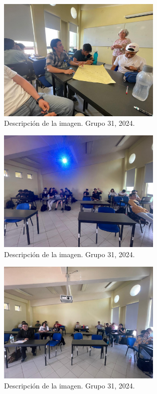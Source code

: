 \begin{figure}
    \caption{Descripción de la imagen. Grupo 31, 2024.\label{fig:No.1}}
    \includegraphics[width=0.7\textwidth]{./assets/img/imagen1DH.jpeg}
\end{figure}

\begin{figure}
    \caption{Descripción de la imagen. Grupo 31, 2024.\label{fig:No.2}}
    \includegraphics[width=0.7\textwidth]{./assets/img/imagen2DH.jpeg}
\end{figure}

\begin{figure}
    \caption{Descripción de la imagen. Grupo 31, 2024.\label{fig:No.3}}
    \includegraphics[width=0.7\textwidth]{./assets/img/imagen3DH.jpeg}
\end{figure}

